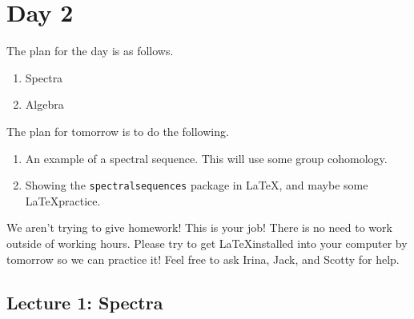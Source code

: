 \section{Day 2}
The plan for the day is as follows. 
\begin{enumerate}
    \item Spectra
    \item Algebra
\end{enumerate}
The plan for tomorrow is to do the following. 
\begin{enumerate}
    \item An example of a spectral sequence. This will use some group cohomology.
    \item Showing the \texttt{spectralsequences} package in \LaTeX, and maybe some \LaTeX practice.
\end{enumerate}
We aren't trying to give homework! This is your job! There is no need to work outside of working hours. Please try to get \LaTeX installed into your computer by tomorrow so we can practice it! Feel free to ask Irina, Jack, and Scotty for help. 

\lineyspace
\subsection{Lecture 1: Spectra}

